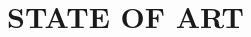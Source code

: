 \vspace{1.5pc}
\vspace{1.5pc}
\section[State of Art]{STATE OF ART}
\begin{spacing}{1.5}
	
\lipsum[1-4]
	
\end{spacing}